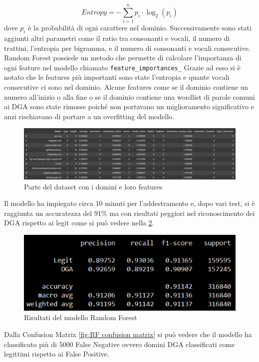\documentclass[12pt,a4paper,openright,twoside]{book}
\begin{document}
\begin{equation}
    Entropy = -\sum_{i=1}^{n} p_i \cdot \log_2(p_i)
\end{equation}
dove $p_i$ è la probabilità di ogni carattere nel dominio. \hfil \break
Successivamente sono stati aggiunti altri parametri come il ratio tra consonanti e vocali,
il numero di trattini, l'entropia per bigramma, e il numero di consonanti e vocali consecutive.
Random Forest possiede un metodo che permette di calcolare l'importanza di ogni feature nel modello
chiamato \texttt{feature\_importances\_}
Grazie ad esso si è notato che le features più importanti sono state
l'entropia e quante vocali consecutive ci sono nel dominio.
Alcune features come se il dominio contiene un numero all'inizio o alla fine
o se il dominio contiene una wordlist di parole comuni ai DGA sono state
rimosse poiché non portavano un miglioramento significativo e anzi 
rischiavano di portare a un overfitting del modello.
\begin{figure}[H]
    \centering
    \includegraphics[width=.8\linewidth]{figures/RF_feature.png}
    \caption{Parte del dataset con i domini e loro features}
    \label{fig:RF feature}
\end{figure}
\noindent Il modello ha impiegato circa 10 minuti per l'addestramento e, dopo vari test,
si è raggiunta un accuratezza del 91\% ma
con risultati peggiori nel riconoscimento dei DGA rispetto ai legit come si può vedere nella \cref{fig:RF results}.

\begin{figure}[H]
    \centering
    \includegraphics[width=.8\linewidth]{figures/RF_results.png}
    \caption{Risultati del modello Random Forest}
    \label{fig:RF results}
\end{figure}

\noindent Dalla Confusion Matrix \ref{fig:RF confusion matrix} si può vedere che il modello ha classificato
più di 5000 False Negative ovvero domini DGA classificati come legittimi rispetto ai False Positive.
\end{document}
